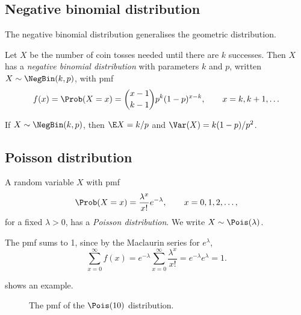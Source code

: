 \subsection{Negative binomial distribution}\label{sec:negative-binomial}

The negative binomial distribution generalises the geometric distribution.

\begin{definition}\label{def:negative-binomial}
Let $X$ be the number of coin tosses needed until there are $k$ successes. Then $X$ has a \emph{negative binomial distribution} with parameters $k$ and $p$, written $X \sim \NegBin(k, p)$, with pmf
\[
  f(x) = \Prob(X = x) = \binom{x - 1}{k - 1} p^k (1-p)^{x-k}, \qquad x = k, k+1, \ldots
\]
\end{definition}

\begin{theorem}\label{thm:negative-binomial-properties}
If $X \sim \NegBin(k, p)$, then $\E X = k/p$ and $\Var(X) = k(1-p)/p^2$.
\end{theorem}

\subsection{Poisson distribution}\label{sec:poisson}

\begin{definition}\label{def:poisson}
A random variable $X$ with pmf
\[
  \Prob(X = x) = \frac{\lambda^x}{x!} e^{-\lambda}, \qquad x = 0, 1, 2, \ldots,
\]
for a fixed $\lambda > 0$, has a \emph{Poisson distribution}. We write $X \sim \Pois(\lambda)$.
\end{definition}

The pmf sums to 1, since by the Maclaurin series for $e^\lambda$,
\[
  \sum_{x=0}^\infty f(x) = e^{-\lambda} \sum_{x=0}^\infty \frac{\lambda^x}{x!} = e^{-\lambda} e^{\lambda} = 1.
\]

 shows an example.

\begin{figure}[ht]
\centering
{}
\caption{The pmf of the $\Pois(10)$ distribution.}
\label{fig:poisson-pmf}
\end{figure}


